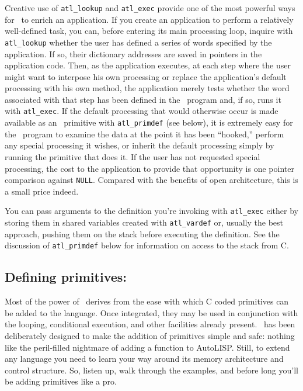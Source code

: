 \documentclass[twocolumn]{article}
\begin{document}
Creative use of \verb+atl_lookup+ and \verb+atl_exec+ provide one of
the most powerful ways for \atlast\ to enrich an application.  If you
create an application to perform a relatively well-defined task, you
can, before entering its main processing loop,
inquire with \verb+atl_lookup+ whether the user has defined a series
of words specified by the application.  If so, their dictionary
addresses are saved in pointers in the application code.  Then, as the
application executes, at each step where the user might want to
interpose his own processing or replace the application's default
processing with his own method, the application merely tests whether
the word associated with that step has been defined in the \atlast\
program and, if so, runs it with \verb+atl_exec+.  If the
default processing that would otherwise occur is made available
as an \atlast\ primitive with \verb+atl_primdef+ (see below), it is
extremely easy for the \atlast\ program to examine the data at the
point it has been ``hooked,'' perform any special processing
it wishes, or inherit the default processing simply by running
the primitive that does it.  If the user has not requested special
processing, the cost to the application to provide that opportunity
is one pointer comparison against {\tt NULL}\@.
Compared with the benefits of open architecture, this is a small price
indeed.

You can pass arguments to the definition you're invoking with
\verb+atl_exec+ either by storing them in shared variables created
with \verb+atl_vardef+ or, usually the best approach, pushing them on
the stack before executing the definition.  See the discussion of
\verb+atl_primdef+ below for information on access to the stack
from C\@.

\subsection{Defining primitives: }

Most of the power of \atlast\ derives from the ease with which C coded
primitives can be added to the language.  Once integrated, they may be
used in conjunction with the looping, conditional execution, and other
facilities already present.  \atlast\ has been
deliberately designed to make the addition of primitives simple and
safe: nothing like the peril-filled nightmare of adding a function to
AutoLISP.  Still, to extend any language you need to learn your way
around its memory architecture and control structure.  So, listen up,
walk through the examples, and before long you'll be adding primitives
like a pro.
\end{document}
